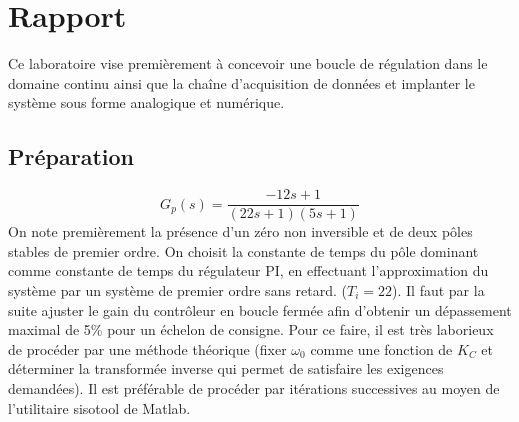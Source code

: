 



\label{s:experimentation}
\chapter{Rapport}
\label{cha:projet}
Ce laboratoire vise premièrement à concevoir une boucle de régulation dans le domaine continu ainsi que la chaîne d'acquisition de données et implanter le système sous forme analogique et numérique.
\section{Préparation}
\begin{equation}
 G_p(s) = \frac{-12s + 1}{(22s +1)(5s+1)}
\end{equation}
On note premièrement la présence d'un zéro non inversible et de deux pôles stables de premier ordre. On choisit la constante de temps du pôle dominant comme constante de temps du régulateur PI, en effectuant l'approximation du système par un système de premier ordre sans retard. ($T_i = 22$). Il faut par la suite ajuster le gain du contrôleur en boucle fermée afin d'obtenir un dépassement maximal de 5\% pour un échelon de consigne. Pour ce faire, il est très laborieux de procéder par une méthode théorique (fixer $\omega_0$ comme une fonction de $K_C$ et déterminer la transformée inverse qui permet de satisfaire les exigences demandées). Il est préférable de procéder par itérations successives au moyen de l'utilitaire sisotool de Matlab. 
